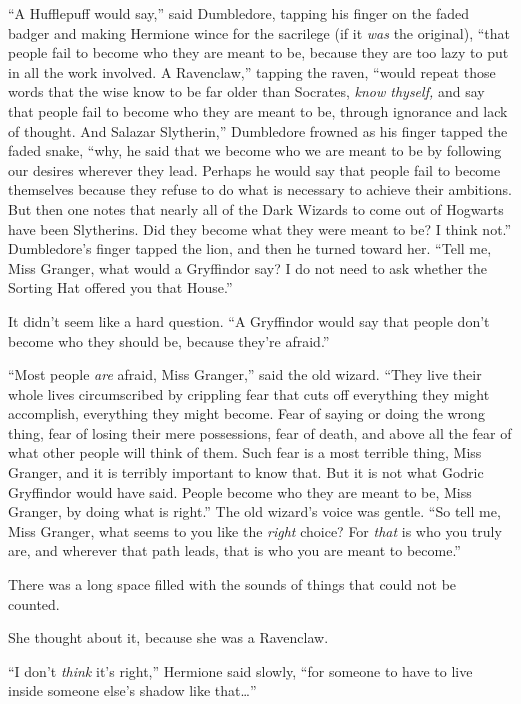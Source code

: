 ``A Hufflepuff would say,'' said Dumbledore, tapping his finger on the
faded badger and making Hermione wince for the sacrilege (if it
\emph{was} the original), ``that people fail to become who they are
meant to be, because they are too lazy to put in all the work involved.
A Ravenclaw,'' tapping the raven, ``would repeat those words that the
wise know to be far older than Socrates, \emph{know thyself,} and say
that people fail to become who they are meant to be, through ignorance
and lack of thought. And Salazar Slytherin,'' Dumbledore frowned as his
finger tapped the faded snake, ``why, he said that we become who we are
meant to be by following our desires wherever they lead. Perhaps he
would say that people fail to become themselves because they refuse to
do what is necessary to achieve their ambitions. But then one notes that
nearly all of the Dark Wizards to come out of Hogwarts have been
Slytherins. Did they become what they were meant to be? I think not.''
Dumbledore's finger tapped the lion, and then he turned toward her.
``Tell me, Miss Granger, what would a Gryffindor say? I do not need to
ask whether the Sorting Hat offered you that House.''

It didn't seem like a hard question. ``A Gryffindor would say that
people don't become who they should be, because they're afraid.''

``Most people \emph{are} afraid, Miss Granger,'' said the old wizard.
``They live their whole lives circumscribed by crippling fear that cuts
off everything they might accomplish, everything they might become. Fear
of saying or doing the wrong thing, fear of losing their mere
possessions, fear of death, and above all the fear of what other people
will think of them. Such fear is a most terrible thing, Miss Granger,
and it is terribly important to know that. But it is not what Godric
Gryffindor would have said. People become who they are meant to be, Miss
Granger, by doing what is right.'' The old wizard's voice was gentle.
``So tell me, Miss Granger, what seems to you like the \emph{right}
choice? For \emph{that} is who you truly are, and wherever that path
leads, that is who you are meant to become.''

There was a long space filled with the sounds of things that could not
be counted.

She thought about it, because she was a Ravenclaw.

``I don't \emph{think} it's right,'' Hermione said slowly, ``for someone
to have to live inside someone else's shadow like that\ldots{}''

